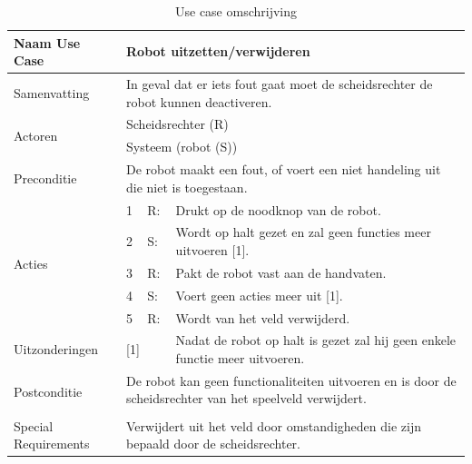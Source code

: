 \documentclass[12pt]{article} %
\begin{document}
\begin{table}[htbp]
  \centering
  \caption{Use case omschrijving}
    \begin{tabular}{llll}
    \toprule
    Naam Use Case & \multicolumn{3}{l}{\textbf{Robot uitzetten/verwijderen}} \\
    \midrule
    Samenvatting & \multicolumn{3}{l}{In geval dat er iets fout gaat moet de scheidsrechter de robot kunnen deactiveren.} \\
    \multirow{2}[2]{*}{Actoren} & \multicolumn{3}{l}{Scheidsrechter (R)} \\
          & \multicolumn{3}{l}{Systeem (robot (S))} \\
    Preconditie & \multicolumn{3}{l}{De robot maakt een fout, of voert een niet handeling uit die niet is toegestaan.} \\
    \multirow{5}[10]{*}{Acties} & 1     & R:    & Drukt op de noodknop van de robot. \\
          & 2     & S:    & Wordt op halt gezet en zal geen functies meer uitvoeren [1]. \\
          & 3     & R:    & Pakt de robot vast aan de handvaten. \\
          & 4     & S:    & Voert geen acties meer uit [1]. \\
          & 5     & R:    & Wordt van het veld verwijderd. \\
    Uitzonderingen & \multicolumn{2}{l}{[1]} & Nadat de robot op halt is gezet zal hij geen enkele functie meer uitvoeren. \\
    \multirow{2}[2]{*}{Postconditie} & \multicolumn{3}{l}{De robot kan geen functionaliteiten uitvoeren en is door de scheidsrechter van het speelveld verwijdert.} \\
          & \multicolumn{3}{l}{} \\
    Special Requirements  & \multicolumn{3}{l}{Verwijdert uit het veld door omstandigheden die zijn bepaald door de scheidsrechter.} \\
    \bottomrule
    \end{tabular}%
  \label{tab:addlabel}%
\end{table}%
\clearpage
\end{document}
